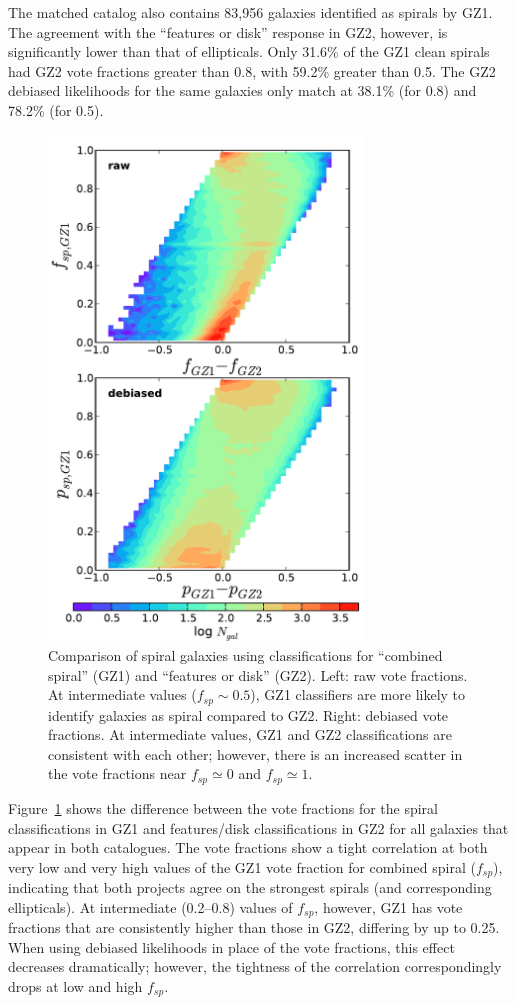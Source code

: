 \documentclass[useAMS,usenatbib]{mn2e}
\begin{document}
The matched catalog also contains 83,956 galaxies identified as spirals by GZ1. The agreement with the ``features or disk'' response in GZ2, however, is significantly lower than that of ellipticals. Only 31.6\% of the GZ1 clean spirals had GZ2 vote fractions greater than 0.8, with 59.2\% greater than 0.5. The GZ2 debiased likelihoods for the same galaxies only match at 38.1\% (for 0.8) and 78.2\% (for 0.5). 

\begin{figure}
\includegraphics[angle=0,width=3.3in]{figures/gz1_gz2_trumpet.pdf}
\caption{Comparison of spiral galaxies using classifications for ``combined spiral'' (GZ1) and ``features or disk'' (GZ2). Left: raw vote fractions. At intermediate values ($f_{sp}\sim0.5$), GZ1 classifiers are more likely to identify galaxies as spiral compared to GZ2. Right: debiased vote fractions. At intermediate values, GZ1 and GZ2 classifications are consistent with each other; however, there is an increased scatter in the vote fractions near $f_{sp}\simeq0$ and $f_{sp}\simeq1$. 
\label{fig-trumpet}}
\end{figure}

Figure~\ref{fig-trumpet} shows the difference between the vote fractions for the spiral classifications in GZ1 and features/disk classifications in GZ2 for all galaxies that appear in both catalogues. The vote fractions show a tight correlation at both very low and very high values of the GZ1 vote fraction for combined spiral ($f_{sp}$), indicating that both projects agree on the strongest spirals (and corresponding ellipticals). At intermediate (0.2--0.8) values of $f_{sp}$, however, GZ1 has vote fractions that are consistently higher than those in GZ2, differing by up to 0.25. When using debiased likelihoods in place of the vote fractions, this effect decreases dramatically; however, the tightness of the correlation correspondingly drops at low and high $f_{sp}$. 
\end{document}
